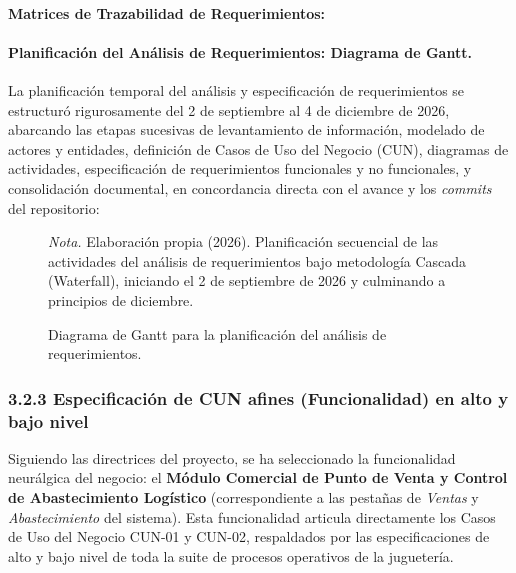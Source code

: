 \documentclass[12pt,a4paper]{article}
\begin{document}
\paragraph{Matrices de Trazabilidad de Requerimientos:}



\vspace{1em}



\paragraph{Planificaci\'on del An\'alisis de Requerimientos: Diagrama de Gantt.}
La planificaci\'on temporal del an\'alisis y especificaci\'on de requerimientos se estructur\'o rigurosamente del 2 de septiembre al 4 de diciembre de 2026, abarcando las etapas sucesivas de levantamiento de informaci\'on, modelado de actores y entidades, definici\'on de Casos de Uso del Negocio (CUN), diagramas de actividades, especificaci\'on de requerimientos funcionales y no funcionales, y consolidaci\'on documental, en concordancia directa con el avance y los \emph{commits} del repositorio:

\begin{figure}[H]
  \caption{Diagrama de Gantt para la planificación del análisis de requerimientos.}
  \label{fig:gantt_analisis_requerimientos}
  \centering
  \resizebox{\textwidth}{!}{}
  \par\vspace{1ex}
  \raggedright\noindent\small \emph{Nota.} Elaboraci\'on propia (2026). Planificaci\'on secuencial de las actividades del an\'alisis de requerimientos bajo metodolog\'ia Cascada (Waterfall), iniciando el 2 de septiembre de 2026 y culminando a principios de diciembre.
\end{figure}

\subsubsection{3.2.3 Especificaci\'on de CUN afines (Funcionalidad) en alto y bajo nivel}

Siguiendo las directrices del proyecto, se ha seleccionado la funcionalidad neurálgica del negocio: el \textbf{Módulo Comercial de Punto de Venta y Control de Abastecimiento Logístico} (correspondiente a las pestañas de \emph{Ventas} y \emph{Abastecimiento} del sistema). Esta funcionalidad articula directamente los Casos de Uso del Negocio CUN-01 y CUN-02, respaldados por las especificaciones de alto y bajo nivel de toda la suite de procesos operativos de la juguetería.
\end{document}
